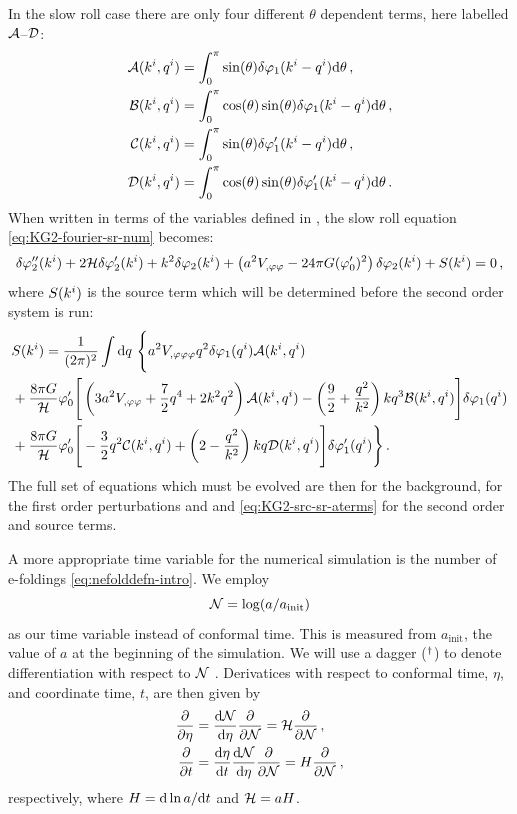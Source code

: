 In the slow roll case there are only four different $\theta$ dependent terms,
here labelled $\mathcal{A}$--$\mathcal{D}$:
%
\begin{align}
\label{eq:AtoD-num}
 \mathcal{A}(k^i,q^i) &= \int_0^\pi \sin(\theta) \delta\varphi_{1}(k^i-q^i) \mathrm{d}\theta \,,
\nonumber\\
 \mathcal{B}(k^i,q^i) &= \int_0^\pi \cos(\theta)\sin(\theta) \delta\varphi_{1}(k^i-q^i)
\mathrm{d}\theta \,,\nonumber\\
 \mathcal{C}(k^i,q^i) &= \int_0^\pi \sin(\theta) \delta\varphi_{1}'(k^i-q^i) \mathrm{d}\theta \,,
\nonumber\\
 \mathcal{D}(k^i,q^i) &= \int_0^\pi \cos(\theta) \sin(\theta) \delta\varphi_{1}'(k^i-q^i)
\mathrm{d}\theta \,.
\end{align}
%
When written in terms of the variables defined in ,
the slow roll equation
\eqref{eq:KG2-fourier-sr-num} becomes:
%
\begin{equation}
\label{eq:KG2-fourier-sr-aterms}
\delta\varphi_{2}''(k^i)+2\mathcal{H}\delta\varphi_{2}'(k^i)+k^2\delta\varphi_{2}(k^i)
+\left(a^2
V_{,\varphi\varphi}-{24 \pi G}(\varphi_{0}')^2\right)
\delta\varphi_{2}(k^i)
+ S(k^i) = 0 \,,
\end{equation}
%
where $S(k^i)$ is the source term which will be determined before the
second order system is run:
\begin{align}
\label{eq:KG2-src-sr-aterms}
&S(\kvi) = \frac{1}{(2\pi)^2}\int \d q\ \Bigg\{
a^2\Uppp q^2 \dvp1(\qvi) \A(\kvi,\qvi) \nonumber\\
&+ \frac{8\pi G}{\H}\vp_{0}' \Bigg[ 
\left( 3a^2\Upp + \frac{7}{2}q^4 + 2k^2q^2\right) \A(\kvi,\qvi)
-\left(\frac{9}{2} + \frac{q^2}{k^2}\right)kq^3 \B(\kvi,\qvi)
\Bigg]\dvp1(\qvi) \nonumber\\
%
&+ \frac{8\pi G}{\H}\vp_{0}' \Bigg[
-\frac{3}{2}q^2 \C(\kvi,\qvi) + \left(2-\frac{q^2}{k^2}\right)kq \D(\kvi,\qvi) 
\Bigg]\dvp1'(\qvi) \Bigg\} \,.
%
\end{align}
%
 The full set of equations which must be evolved are
then  for the background,  for the first
order perturbations and  and
\eqref{eq:KG2-src-sr-aterms} for the second order and source terms.


A more appropriate time variable for the numerical simulation is the
number of e-foldings \eqref{eq:nefolddefn-intro}. We employ 
%
\begin{equation}
\label{eq:def-ntime}
\mathcal{N} = \log ( a / a_{\mathrm{init}} )
\end{equation}
%
as our time variable instead of conformal time. This is measured from
$a_{\mathrm{init}}$, the value of $a$ at the beginning of the
simulation. We will use a dagger ($^{\dagger}$) to denote\footnotemark
differentiation with respect to $\mathcal{N}$ 
.
% 
Derivatices with respect to conformal time, $\eta$, and coordinate time, $t$, are
then given by
%
\begin{align}
 \frac{\partial  }{\partial \eta} &= \frac{\mathrm{d} \mathcal{N}}{\mathrm{d} \eta}\frac{\partial }{\partial \mathcal{N}} = \mathcal{H} \frac{\partial }{\partial \mathcal{N}} \,,\\
 \frac{\partial  }{\partial t} &= \frac{\mathrm{d} \eta}{\mathrm{d} t} \frac{\mathrm{d} \mathcal{N}}{\mathrm{d} \eta}\frac{\partial }{\partial \mathcal{N}} = H
\frac{\partial }{\partial \mathcal{N}}\,,
\end{align}
%
respectively, where $H = \mathrm{d} \ln a/\mathrm{d} t$ and $\mathcal{H} = aH$.
% 

